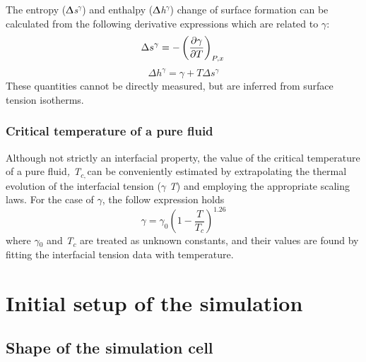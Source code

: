 \documentclass[9pt,bestpractices]{livecoms}
\begin{document}
The entropy (${\Updelta}$\textit{s}$^{{\gamma}}$) and enthalpy
(${\Updelta}$\textit{h}$^{{\gamma}}$) change of surface formation can be
calculated from the following derivative expressions which are related to
{${\gamma}$}\citep{evans1992}: 
\begin{equation}
  \Delta s^{\gamma} =-\left(\frac{\partial\gamma}{\partial T}\right)_{P,x} \\
  \label{eq:6}
\end{equation}
\begin{equation}
  \Delta h^{\gamma} =\gamma+T\Delta s^{\gamma}
  \label{eq:7}
\end{equation}
These quantities cannot be directly measured, but are inferred from surface tension isotherms.

\subsubsection{Critical temperature of a pure fluid}

Although not strictly an interfacial property, the value of the critical
temperature of a pure fluid\textit{, T}$_{c, }$can be conveniently estimated by
extrapolating the thermal evolution of the interfacial tension (${\gamma}$
\textendash{} \textit{T}) and employing the appropriate scaling laws. For the
case of ${\gamma}$, the follow expression holds\citep{evans1992}
\begin{equation}
\gamma=\gamma_{0}\left(1-\frac{T}{T_{c}}\right)^{1.26}
\label{eq:8}
\end{equation}
where ${\gamma}$$_{0}$ and \textit{T}$_{c}$ are treated as unknown constants,
and their values are found by fitting the interfacial tension data with
temperature.

\section{Initial setup of the simulation}
\label{sec:setup}
\subsection{Shape of the simulation cell}
\end{document}
